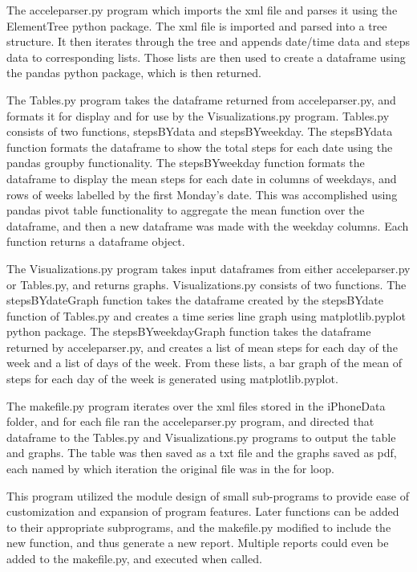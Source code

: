 \documentclass[sigconf]{acmart}
\begin{document}
The acceleparser.py program which imports the xml file and parses it using the ElementTree python package. The xml file is imported and parsed into a tree structure. It then iterates through the tree and appends date/time data and steps data to corresponding lists. Those lists are then used to create a dataframe using the pandas python package, which is then returned. 

The Tables.py program takes the dataframe returned from acceleparser.py, and formats it for display and for use by the Visualizations.py program. Tables.py consists of two functions, stepsBYdata and stepsBYweekday. The stepsBYdata function formats the dataframe to show the total steps for each date using the pandas groupby functionality. The stepsBYweekday function formats the dataframe to display the mean steps for each date in columns of weekdays, and rows of weeks labelled by the first Monday's date. This was accomplished using pandas pivot table functionality to aggregate the mean function over the dataframe, and then a new dataframe was made with the weekday columns. Each function returns a dataframe object.

The Visualizations.py program takes input dataframes from either acceleparser.py or Tables.py, and returns graphs. Visualizations.py consists of two functions. The stepsBYdateGraph function takes the dataframe created by the stepsBYdate function of Tables.py and creates a time series line graph using matplotlib.pyplot python package. The stepsBYweekdayGraph function takes the dataframe returned  by acceleparser.py, and creates a list of mean steps for each day of the week and a list of days of the week. From these lists, a bar graph of the mean of steps for each day of the week is generated using matplotlib.pyplot.

The makefile.py program iterates over the xml files stored in the iPhoneData folder, and for each file ran the acceleparser.py program, and directed that dataframe to the Tables.py and Visualizations.py programs to output the table and graphs. The table was then saved as a txt file and the graphs saved as pdf, each named by which iteration the original file was in the for loop.

This program utilized the module design of small sub-programs to provide ease of customization and expansion of program features. Later functions can be added to their appropriate subprograms, and the makefile.py modified to include the new function, and thus generate a new report. Multiple reports could even be added to the makefile.py, and executed when called.
\end{document}
